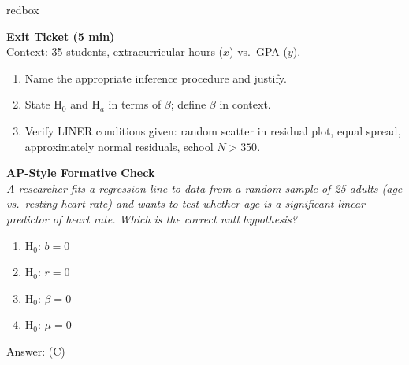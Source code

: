 \documentclass[10pt]{article}
\begin{document}
\begin{skillbox}{redbox}
\begin{minipage}[t]{0.48\linewidth}
    \textbf{Exit Ticket (5 min)}\\
    Context: 35 students, extracurricular hours ($x$) vs.\ GPA ($y$).
    \begin{enumerate}
        \item Name the appropriate inference procedure and justify.
        \item State H$_0$ and H$_a$ in terms of $\beta$; define $\beta$ in context.
        \item Verify LINER conditions given: random scatter in residual plot, equal
              spread, approximately normal residuals, school $N > 350$.
    \end{enumerate}
\end{minipage}
\hfill
\begin{minipage}[t]{0.48\linewidth}
    \textbf{AP-Style Formative Check}\\
    \textit{A researcher fits a regression line to data from a random sample of 25
    adults (age vs.\ resting heart rate) and wants to test whether age is a
    significant linear predictor of heart rate. Which is the correct null hypothesis?}
    \begin{enumerate}[label=(\Alph*)]
        \item H$_0$: $b = 0$
        \item H$_0$: $r = 0$
        \item H$_0$: $\beta = 0$
        \item H$_0$: $\mu = 0$
    \end{enumerate}
    Answer: (C)
\end{minipage}
\end{skillbox}
\end{document}
